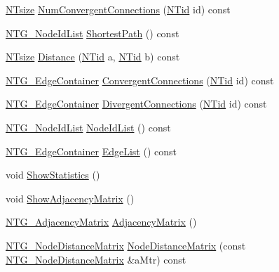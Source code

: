 \begin{DoxyCompactItemize}
\hyperlink{nt__types_8h_a06c124f2e4469769b58230253ce0560b}{NTsize} \hyperlink{class_n_t_g__graph__o_a54943c4097f01b433f261b7d6b241ad8}{NumConvergentConnections} (\hyperlink{nt__types_8h_ab5cab5f78fdd2211c340cbe527a4afd7}{NTid} id) const 
\item 
\hyperlink{ntg__graph__obj_8h_a589ab3be7065e1ceabfbecb775d71349}{NTG\_\-NodeIdList} \hyperlink{class_n_t_g__graph__o_ae3416a67d80f7e4567a31596b9dc5b79}{ShortestPath} () const 
\item 
\hyperlink{nt__types_8h_a06c124f2e4469769b58230253ce0560b}{NTsize} \hyperlink{class_n_t_g__graph__o_ab5eb47f53af27d6032035672ccfb0881}{Distance} (\hyperlink{nt__types_8h_ab5cab5f78fdd2211c340cbe527a4afd7}{NTid} a, \hyperlink{nt__types_8h_ab5cab5f78fdd2211c340cbe527a4afd7}{NTid} b) const 
\item 
\hyperlink{ntg__graph__obj_8h_a8b20c3ac567fe3422004ba5a14def650}{NTG\_\-EdgeContainer} \hyperlink{class_n_t_g__graph__o_ac8070f0ba43159db61cef2909994ea84}{ConvergentConnections} (\hyperlink{nt__types_8h_ab5cab5f78fdd2211c340cbe527a4afd7}{NTid} id) const 
\item 
\hyperlink{ntg__graph__obj_8h_a8b20c3ac567fe3422004ba5a14def650}{NTG\_\-EdgeContainer} \hyperlink{class_n_t_g__graph__o_a193da91bca8a9870d57da500a70fcd51}{DivergentConnections} (\hyperlink{nt__types_8h_ab5cab5f78fdd2211c340cbe527a4afd7}{NTid} id) const 
\item 
\hyperlink{ntg__graph__obj_8h_a589ab3be7065e1ceabfbecb775d71349}{NTG\_\-NodeIdList} \hyperlink{class_n_t_g__graph__o_a6e2d28a6e3c37c3f786061fbdff90117}{NodeIdList} () const 
\item 
\hyperlink{ntg__graph__obj_8h_a8b20c3ac567fe3422004ba5a14def650}{NTG\_\-EdgeContainer} \hyperlink{class_n_t_g__graph__o_aac2275517537dd66901453bfe70dab25}{EdgeList} () const 
\item 
void \hyperlink{class_n_t_g__graph__o_ad2f5e92204488ec49b4ce71ca0fe387c}{ShowStatistics} ()
\item 
void \hyperlink{class_n_t_g__graph__o_a3f1101b553a872a5fda97b8ba74a7bef}{ShowAdjacencyMatrix} ()
\item 
\hyperlink{class_t_n_t_1_1_matrix}{NTG\_\-AdjacencyMatrix} \hyperlink{class_n_t_g__graph__o_afe5b178cd2ad0321f530ff40b1cb677c}{AdjacencyMatrix} ()
\item 
\hyperlink{class_t_n_t_1_1_matrix}{NTG\_\-NodeDistanceMatrix} \hyperlink{class_n_t_g__graph__o_a27e6647b9758049da6f00697e007107a}{NodeDistanceMatrix} (const \hyperlink{class_t_n_t_1_1_matrix}{NTG\_\-NodeDistanceMatrix} \&aMtr) const 

\end{DoxyCompactItemize}

